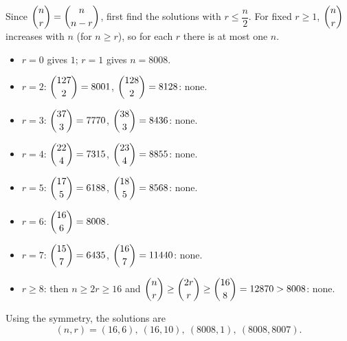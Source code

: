 Since $\dbinom nr=\dbinom n{n-r}$, first find the solutions with $r\le\dfrac n2$. For fixed $r\ge1$, $\dbinom nr$ increases with $n$ (for $n\ge r$), so for each $r$ there is at most one $n$.
\begin{itemize}
\item $r=0$ gives $1$; $r=1$ gives $n=8008$.
\item $r=2$: $\dbinom{127}{2}=8001$, $\dbinom{128}{2}=8128$: none.
\item $r=3$: $\dbinom{37}{3}=7770$, $\dbinom{38}{3}=8436$: none.
\item $r=4$: $\dbinom{22}{4}=7315$, $\dbinom{23}{4}=8855$: none.
\item $r=5$: $\dbinom{17}{5}=6188$, $\dbinom{18}{5}=8568$: none.
\item $r=6$: $\dbinom{16}{6}=8008$. \checkmark
\item $r=7$: $\dbinom{15}{7}=6435$, $\dbinom{16}{7}=11440$: none.
\item $r\ge8$: then $n\ge2r\ge16$ and $\dbinom nr\ge\dbinom{2r}{r}\ge\dbinom{16}{8}=12870>8008$: none.
\end{itemize}
Using the symmetry, the solutions are
\[\boxed{(n,r)=(16,6),\ (16,10),\ (8008,1),\ (8008,8007)}.\]

